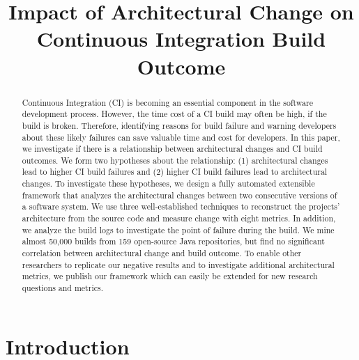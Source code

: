\documentclass[conference]{IEEEtran}
\begin{document}
\title{Impact of Architectural Change on
	Continuous Integration Build Outcome\\
}

\author{

\and
{}
}

\maketitle

\begin{abstract}
Continuous Integration (CI) is becoming an essential component in the software development process.
However, the time cost of a CI build may often be high, if the build is broken.
Therefore, identifying reasons for build failure and warning developers about these likely failures can save valuable time and cost for developers.
In this paper, we investigate if there is a relationship between architectural changes and CI build outcomes.
We form two hypotheses about the relationship: (1) architectural changes lead to higher CI build failures and (2) higher CI build failures lead to architectural changes.
To investigate these hypotheses, we design a fully automated extensible framework that analyzes the architectural changes between two consecutive versions of a software system.
We use three well-established techniques to reconstruct the projects' architecture from the source code and measure change with eight metrics. 
In addition, we analyze the build logs to investigate the point of failure during the build. 
We mine almost 50,000 builds from 159 open-source Java repositories, but find no significant correlation between architectural change and build outcome. 
To enable other researchers to replicate our negative results and to investigate additional architectural metrics, we publish our framework which can easily be extended for new research questions and metrics.
\end{abstract}

\section{Introduction}
\end{document}
